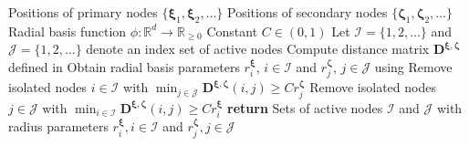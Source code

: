 \begin{algorithmic}[1]
    \Require Positions of primary nodes $\{\boldsymbol{\xi}_1, \boldsymbol{\xi}_2, \dots\}$
    \Require Positions of secondary nodes $\{\boldsymbol{\zeta}_1, \boldsymbol{\zeta}_2, \dots\}$
    \Require Radial basis function $\phi: \mathbb{R}^d \to \mathbb{R}_{\geq 0}$
    \Require Constant $C \in (0, 1)$
    \State Let $\mathcal{I} = \{1, 2, \dots \}$ and $\mathcal{J} = \{1, 2, \dots \}$ denote an index set of active nodes
    \State Compute distance matrix $\mathbf{D}^{\boldsymbol{\xi}, \boldsymbol{\zeta}}$ defined in 
        \State Obtain radial basis parameters $r^{\boldsymbol{\xi}}_i$, $i \in \mathcal{I}$ and
        $r^{\boldsymbol{\zeta}}_j$, $j \in \mathcal{J}$ using 
        \State Remove isolated nodes $i \in \mathcal{I}$ with $\min_{j \in \mathcal{J}} \mathbf{D}^{\boldsymbol{\xi}, \boldsymbol{\zeta}}(i, j) \geq Cr^{\boldsymbol{\zeta}}_j$ 
        \State Remove isolated nodes $j \in \mathcal{J}$ with $\min_{i \in \mathcal{I}} \mathbf{D}^{\boldsymbol{\xi}, \boldsymbol{\zeta}}(i, j) \geq Cr^{\boldsymbol{\xi}}_i$ 
    \EndWhile
    \State \textbf{return} Sets of active nodes $\mathcal{I}$ and $\mathcal{J}$ with radius parameters $r^{\boldsymbol{\xi}}_i, i \in \mathcal{I}$ and $r^{\boldsymbol{\zeta}}_j, j \in \mathcal{J}$
\end{algorithmic}